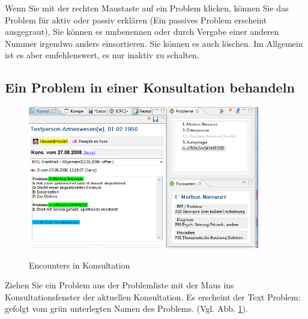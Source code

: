 \documentclass[a4paper]{scrartcl}
\begin{document}
\medskip

Wenn Sie mit der rechten Maustaste auf ein Problem klicken, können Sie das Problem für aktiv oder passiv erklären (Ein passives Problem erscheint ausgegraut), Sie können es umbenennen oder durch Vergabe einer anderen Nummer irgendwo anders einsortieren. Sie können es auch löschen. Im Allgemein ist es aber emfehlenswert, es nur inaktiv zu schalten.



\subsection{Ein Problem in einer Konsultation behandeln}
\begin{figure}
  \includegraphics[width=0.9\textwidth]{icpc2}\\
  \caption{Encounters in Konsultation}\label{fig:icpc3}
\end{figure}

Ziehen Sie ein Problem aus der Problemliste mit der Maus ins Konsultationsfenster der aktuellen Konsultation. Es erscheint der Text Problem: gefolgt vom grün unterlegten Namen des Problems. (Vgl. Abb. \ref{fig:icpc3}).
\end{document}
